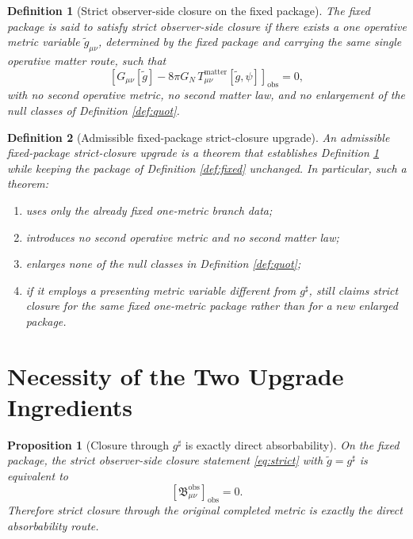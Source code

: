 \documentclass[11pt]{article}
\newcommand{\CompletedMetric}{g^{\sharp}}
\newcommand{\PresentedMetric}{\widetilde g}
\newcommand{\ObsBurden}{\mathfrak B_{\mu\nu}^{\mathrm{obs}}}
\newcommand{\ObserverClass}[1]{\left[#1\right]_{\mathrm{obs}}}
\newtheorem{definition}{Definition}
\newtheorem{proposition}{Proposition}
\begin{document}
\begin{definition}[Strict observer-side closure on the fixed package]
\label{def:strict}
The fixed package is said to satisfy \emph{strict observer-side closure} if there exists a one operative metric variable \(\PresentedMetric_{\mu\nu}\), determined by the fixed package and carrying the same single operative matter route, such that
\begin{equation}
\ObserverClass{G_{\mu\nu}[\PresentedMetric]-8\pi G_N\,T_{\mu\nu}^{\mathrm{matter}}[\PresentedMetric,\psi]}=0,
\label{eq:strict}
\end{equation}
with no second operative metric, no second matter law, and no enlargement of the null classes of Definition \ref{def:quot}.
\end{definition}

\begin{definition}[Admissible fixed-package strict-closure upgrade]
\label{def:admissible}
An \emph{admissible fixed-package strict-closure upgrade} is a theorem that establishes Definition \ref{def:strict} while keeping the package of Definition \ref{def:fixed} unchanged. In particular, such a theorem:
\begin{enumerate}
    \item uses only the already fixed one-metric branch data;
    \item introduces no second operative metric and no second matter law;
    \item enlarges none of the null classes in Definition \ref{def:quot};
    \item if it employs a presenting metric variable different from \(\CompletedMetric\), still claims strict closure for the same fixed one-metric package rather than for a new enlarged package.
\end{enumerate}
\end{definition}

\section{Necessity of the Two Upgrade Ingredients}

\begin{proposition}[Closure through \texorpdfstring{\(\CompletedMetric\)}{g-sharp} is exactly direct absorbability]
\label{prop:directequiv}
On the fixed package, the strict observer-side closure statement \eqref{eq:strict} with \(\PresentedMetric=\CompletedMetric\) is equivalent to
\begin{equation}
\ObserverClass{\ObsBurden}=0.
\label{eq:directzero}
\end{equation}
Therefore strict closure through the original completed metric is exactly the direct absorbability route.
\end{proposition}
\end{document}
